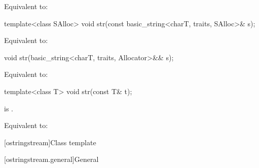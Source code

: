 \begin{itemdescr}
\pnum
\effects
Equivalent to: 
\end{itemdescr}

%
\begin{itemdecl}
template<class SAlloc>
  void str(const basic_string<charT, traits, SAlloc>& s);
\end{itemdecl}

\begin{itemdescr}
\pnum
\effects
Equivalent to: 
\end{itemdescr}

%
\begin{itemdecl}
void str(basic_string<charT, traits, Allocator>&& s);
\end{itemdecl}

\begin{itemdescr}
\pnum
\effects
Equivalent to: 
\end{itemdescr}

%
\begin{itemdecl}
template<class T>
  void str(const T& t);
\end{itemdecl}

\begin{itemdescr}
\pnum
\constraints
{}
is .

\pnum
\effects
Equivalent to: 
\end{itemdescr}

[ostringstream]{Class template }

[ostringstream.general]{General}


